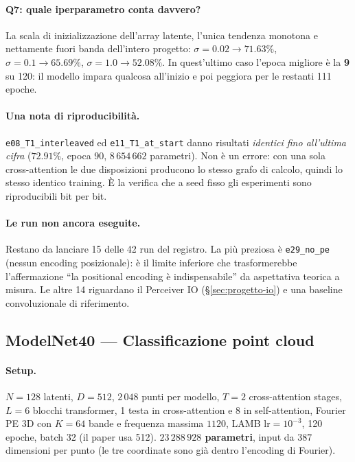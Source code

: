 \documentclass[
  11pt,
]{article}
\begin{document}
\paragraph{Q7: quale iperparametro conta davvero?}
La scala di inizializzazione dell'array latente, l'unica tendenza monotona e nettamente fuori banda dell'intero progetto: $\sigma = 0.02 \to 71.63\%$, $\sigma = 0.1 \to 65.69\%$, $\sigma = 1.0 \to \mathbf{52.08\%}$. In quest'ultimo caso l'epoca migliore è la \textbf{9} su 120: il modello impara qualcosa all'inizio e poi peggiora per le restanti 111 epoche.

\paragraph{Una nota di riproducibilità.} \texttt{e08\_T1\_interleaved} ed \texttt{e11\_T1\_at\_start} danno risultati \emph{identici fino all'ultima cifra} ($72.91\%$, epoca 90, $8\,654\,662$ parametri). Non è un errore: con una sola cross-attention le due disposizioni producono lo stesso grafo di calcolo, quindi lo stesso identico training. È la verifica che a seed fisso gli esperimenti sono riproducibili bit per bit.

\paragraph{Le run non ancora eseguite.} Restano da lanciare 15 delle 42 run del registro. La più preziosa è \texttt{e29\_no\_pe} (nessun encoding posizionale): è il limite inferiore che trasformerebbe l'affermazione ``la positional encoding è indispensabile'' da aspettativa teorica a misura. Le altre 14 riguardano il Perceiver IO (§\ref{sec:progetto-io}) e una baseline convoluzionale di riferimento.

\subsection{ModelNet40 --- Classificazione point cloud}
\label{sec:progetto-modelnet}

\paragraph{Setup.} $N=128$ latenti, $D=512$, $2\,048$ punti per modello, $T=2$ cross-attention stages, $L=6$ blocchi transformer, 1 testa in cross-attention e 8 in self-attention, Fourier PE 3D con $K=64$ bande e frequenza massima $1120$, LAMB $\text{lr} = 10^{-3}$, 120 epoche, batch 32 (il paper usa 512). \textbf{$23\,288\,928$ parametri}, input da $387$ dimensioni per punto (le tre coordinate sono già dentro l'encoding di Fourier).
\end{document}
